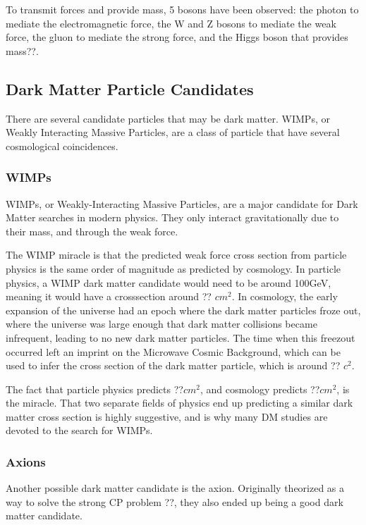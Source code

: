 To transmit forces and provide mass, 5 bosons have been observed: the photon to mediate the electromagnetic force, the W and Z bosons to mediate the weak force, the gluon to mediate the strong force, and the Higgs boson that provides mass??.

\subsection{Dark Matter Particle Candidates}

There are several candidate particles that may be dark matter.
WIMPs, or Weakly Interacting Massive Particles, are a class of particle that have several cosmological coincidences.

\subsubsection{WIMPs}

WIMPs, or Weakly-Interacting Massive Particles, are a major candidate for Dark Matter searches in modern physics.
They only interact gravitationally due to their mass, and through the weak force.

The WIMP miracle is that the predicted weak force cross section from particle physics is the same order of magnitude as predicted by cosmology.
In particle physics, a WIMP dark matter candidate would need to be around 100GeV, meaning it would have a crosssection around ?? $cm^{2}$.
In cosmology, the early expansion of the universe had an epoch where the dark matter particles froze out, where the universe was large enough that dark matter collisions became infrequent, leading to no new dark matter particles.
The time when this freezout occurred left an imprint on the Microwave Cosmic Background, which can be used to infer the cross section of the dark matter particle, which is around ?? $c^{2}$.

The fact that particle physics predicts ??$cm^{2}$, and cosmology predicts ??$cm^{2}$, is the miracle.
That two separate fields of physics end up predicting a similar dark matter cross section is highly suggestive, and is why many DM studies are devoted to the search for WIMPs.


\subsubsection{Axions}

Another possible dark matter candidate is the axion.
Originally theorized as a way to solve the strong CP problem ??, they also ended up being a good dark matter candidate.

